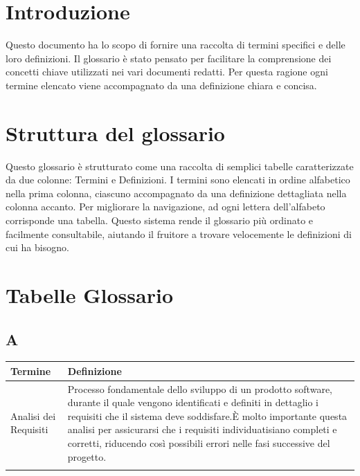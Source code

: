 \documentclass[10pt]{article}
\begin{document}
\section{Introduzione}
Questo documento ha lo scopo di fornire una raccolta di termini specifici e delle loro definizioni. Il glossario è stato pensato per facilitare la comprensione dei concetti chiave utilizzati nei vari documenti redatti. Per questa ragione ogni termine elencato viene accompagnato da una definizione chiara e concisa.\\

\section{Struttura del glossario}
Questo glossario è strutturato come una raccolta di semplici tabelle caratterizzate da due colonne: Termini e Definizioni. I termini sono elencati in ordine alfabetico nella prima colonna, ciascuno accompagnato da una definizione dettagliata nella colonna accanto. \newline
Per migliorare la navigazione, ad ogni lettera dell'alfabeto corrisponde una tabella. Questo sistema rende il glossario più ordinato e facilmente consultabile, aiutando il fruitore a trovare velocemente le definizioni di cui ha bisogno.\\

\newpage
\section{Tabelle Glossario}

\vspace{2mm}
\renewcommand{\arraystretch}{1.5} %
\setlength{\tabcolsep}{10pt} %

\subsection{A} %
\begin{tabularx}{\textwidth}{|>{\centering\arraybackslash}l|X|}
\hline
\rowcolor[gray]{0.8}
\textbf{Termine} & \textbf{Definizione}\\
\hline
Analisi dei Requisiti & Processo fondamentale dello sviluppo di un prodotto software, durante il quale vengono identificati e definiti in dettaglio i requisiti che il sistema deve soddisfare.\newline È molto importante questa analisi per assicurarsi che i requisiti individuatisiano completi e corretti, riducendo così possibili errori nelle fasi successive del progetto.\\
\hline
 & \\
\hline
\end{tabularx}
\end{document}
